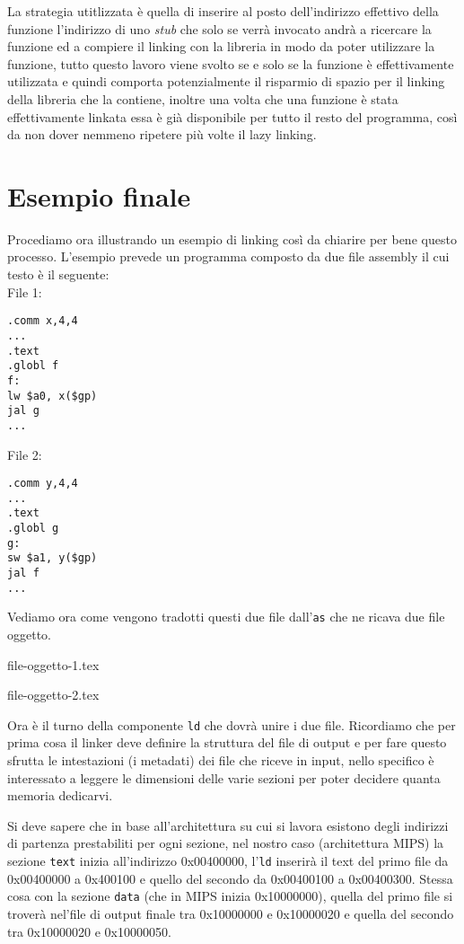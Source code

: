 \documentclass[class=book, crop=false, oneside]{standalone}
\begin{document}
La strategia utitlizzata è quella di inserire al posto dell'indirizzo effettivo della funzione l'indirizzo di uno \emph{stub} che solo se verrà invocato andrà a ricercare la funzione ed a compiere il linking con la libreria in modo da poter utilizzare la funzione, tutto questo lavoro viene svolto se e solo se la funzione è effettivamente utilizzata e quindi comporta potenzialmente il risparmio di spazio per il linking della libreria che la contiene, inoltre una volta che una funzione è stata effettivamente linkata essa è già disponibile per tutto il resto del programma, così da non dover nemmeno ripetere più volte il lazy linking.

\section{Esempio finale}
Procediamo ora illustrando un esempio di linking così da chiarire per bene questo processo.
L'esempio prevede un programma composto da due file assembly il cui testo è il seguente:\\
File 1:
\begin{verbatim}
.comm x,4,4
...
.text
.globl f
f:
lw $a0, x($gp)
jal g
...
\end{verbatim}
File 2:
\begin{verbatim}
.comm y,4,4
...
.text
.globl g
g:
sw $a1, y($gp)
jal f
...
\end{verbatim}
Vediamo ora come vengono tradotti questi due file dall'\texttt{as} che ne ricava due file oggetto.
\begin{table}[H]
	{file-oggetto-1.tex}
	\caption{File oggetto 1}
\end{table}
\begin{table}[H]
	{file-oggetto-2.tex}
	\caption{File oggetto 2}
\end{table}
Ora è il turno della componente \texttt{ld} che dovrà unire i due file.
Ricordiamo che per prima cosa il linker deve definire la struttura del file di output e per fare questo sfrutta le intestazioni (i metadati) dei file che riceve in input, nello specifico è interessato a leggere le dimensioni delle varie sezioni per poter decidere quanta memoria dedicarvi.

Si deve sapere che in base all'architettura su cui si lavora esistono degli indirizzi di partenza prestabiliti per ogni sezione, nel nostro caso (architettura MIPS) la sezione \texttt{text} inizia all'indirizzo 0x00400000, l'\texttt{ld} inserirà il text del primo file da 0x00400000 a  0x400100 e quello del secondo da 0x00400100 a 0x00400300.
Stessa cosa con la sezione \texttt{data} (che in MIPS inizia 0x10000000), quella del primo file si troverà nel'file di output finale tra 0x10000000 e 0x10000020 e quella del secondo tra 0x10000020 e 0x10000050.
\end{document}

